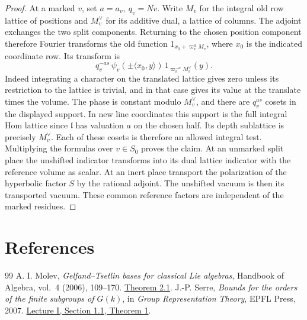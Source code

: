 \documentclass[a4paper,11pt]{article}
\theoremstyle{definition}
\theoremstyle{remark}
\numberwithin{equation}{section}
\begin{document}
\begin{proof}
At a marked \(v\), set \(a=a_v,\ q_v=Nv\). Write \(M_v\) for
the integral old row lattice of positions and \(M_v^\vee\) for
its additive dual, a lattice of columns. The adjoint exchanges
the two split components. Returning to the chosen position
component therefore Fourier transforms the old function
\(1_{x_0+\varpi_v^a M_v}\), where \(x_0\) is the indicated
coordinate row. Its transform is
\[
   q_v^{-as}\,\psi_v(\pm\langle x_0,y\rangle)\,
                        1_{\varpi_v^{-a}M_v^\vee}(y).
\]
Indeed integrating a character on the translated lattice gives
zero unless its restriction to the lattice is trivial, and in
that case gives its value at the translate times the volume.
The phase is constant modulo \(M_v^\vee\), and there are
\(q_v^{as}\) cosets in the displayed support. In new line
coordinates this support is the full integral Hom lattice since
\(\mathfrak l\) has valuation \(a\) on the chosen half. Its
depth sublattice is precisely \(M_v^\vee\). Each of these
cosets is therefore an allowed integral test. Multiplying the
formulas over \(v\in S_0\) proves the claim. At an unmarked
split place the unshifted indicator transforms into its dual
lattice indicator with the reference volume as scalar. At an
inert place transport the polarization of the hyperbolic
factor \(S\) by the rational adjoint. The unshifted vacuum is
then its transported vacuum. These common reference factors
are independent of the marked residues.
\end{proof}

\clearpage
\section{References}\label{nav:bibliography-XIX}
\begingroup{}\begin{thebibliography}{99}\small
{} A. I. Molev, \emph{Gelfand--Tsetlin bases for classical Lie algebras}, Handbook of Algebra, vol.~4 (2006), 109--170. \href{https://www.maths.usyd.edu.au/u/pubs/publist/preprints/2002/molev-18.pdf}{Theorem 2.1}.
 J.-P. Serre, \emph{Bounds for the orders of the finite subgroups of \(G(k)\)}, in \emph{Group Representation Theory}, EPFL Press, 2007. \href{https://arxiv.org/pdf/1011.0346}{Lecture I, Section 1.1, Theorem 1}.
\end{thebibliography}\endgroup
\end{document}

